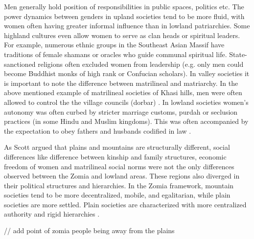  Men generally hold position of responsibilities in public spaces, politics etc. The power dynamics between genders in upland societies tend to be more fluid, with women often having greater informal influence than in lowland patriarchies. Some highland cultures even allow women to serve as clan heads or spiritual leaders.  For example, numerous ethnic groups in the Southeast Asian Massif have traditions of female shamans or oracles who guide communal spiritual life. State-sanctioned religions often excluded women from leadership (e.g. only men could become Buddhist monks of high rank or Confucian scholars). In valley societies it is important to note the difference between matrilineal and matriarchy. In the above mentioned example of matrilineal societies of Khasi hills, men were often allowed to control the the village councils (dorbar) \citep{WashingtonPost_2015,TheGuardian2011}. In lowland societies women’s autonomy was often curbed by stricter marriage customs, purdah or seclusion practices (in some Hindu and Muslim kingdoms). This was often accompanied by the expectation to obey fathers and husbands codified in law \citep{Papanek_1973,Devi2019}.


As Scott argued that plains and mountains are structurally different, social differences like difference between kinship and family structures, economic freedom of women and matrilineal social norms were not the only differences observed between the Zomia and lowland areas. These regions also diverged in their political structures and hierarchies. In the Zomia framework, mountain societies tend to be more decentralized, mobile, and egalitarian, while plain societies are more settled. Plain societies are characterized with more centralized authority and rigid hierarchies \citep{Hammond_2011}.

// add point of zomia people being away from the plains

